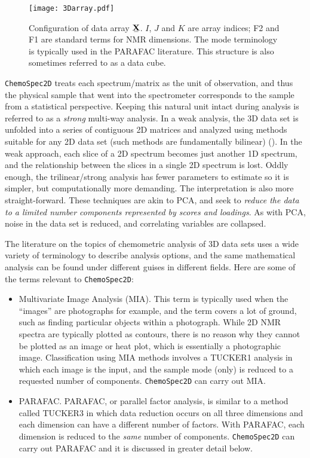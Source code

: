 \documentclass[10pt,twocolumn,twoside,]{pinp}
\providecommand{\tightlist}{%
  \setlength{\itemsep}{0pt}\setlength{\parskip}{0pt}}
\begin{document}
\begin{figure}
\begin{center}
  \texttt{[image: 3Darray.pdf]}
  \caption{\label{3Darray}Configuration of data array $\stackunder[1.2pt]{$\mathbf{X}$}{\rule{1.2ex}{.075ex}}$. $I$, $J$ and $K$ are array indices; F2 and F1 are standard terms for NMR dimensions. The mode terminology is typically used in the PARAFAC literature.  This structure is also sometimes referred to as a data cube.}
\end{center}
\end{figure}

\texttt{ChemoSpec2D} treats each spectrum/matrix as the unit of
observation, and thus the physical sample that went into the
spectrometer corresponds to the sample from a statistical perspective.
Keeping this natural unit intact during analysis is referred to as a
\emph{strong} multi-way analysis. In a weak analysis, the 3D data set is
unfolded into a series of contiguous 2D matrices and analyzed using
methods suitable for any 2D data set (such methods are fundamentally
bilinear) (\cite{Huang2003}). In the weak approach, each slice of a 2D
spectrum becomes just another 1D spectrum, and the relationship between
the slices in a single 2D spectrum is lost. Oddly enough, the
trilinear/strong analysis has fewer parameters to estimate so it is
simpler, but computationally more demanding. The interpretation is also
more straight-forward. These techniques are akin to PCA, and seek to
\emph{reduce the data to a limited number components represented by
scores and loadings}. As with PCA, noise in the data set is reduced, and
correlating variables are collapsed.

The literature on the topics of chemometric analysis of 3D data sets
uses a wide variety of terminology to describe analysis options, and the
same mathematical analysis can be found under different guises in
different fields. Here are some of the terms relevant to
\texttt{ChemoSpec2D}:

\begin{itemize}
\tightlist
\item
  Multivariate Image Analysis (MIA). This term is typically used when
  the ``images'' are photographs for example, and the term covers a lot
  of ground, such as finding particular objects within a photograph.
  While 2D NMR spectra are typically plotted as contours, there is no
  reason why they cannot be plotted as an image or heat plot, which is
  essentially a photographic image. Classification using MIA methods
  involves a TUCKER1 analysis in which each image is the input, and the
  sample mode (only) is reduced to a requested number of components.
  \texttt{ChemoSpec2D} can carry out MIA.
\item
  PARAFAC. PARAFAC, or parallel factor analysis, is similar to a method
  called TUCKER3 in which data reduction occurs on all three dimensions
  and each dimension can have a different number of factors. With
  PARAFAC, each dimension is reduced to the \emph{same} number of
  components. \texttt{ChemoSpec2D} can carry out PARAFAC and it is
  discussed in greater detail below.
\end{itemize}
\end{document}

